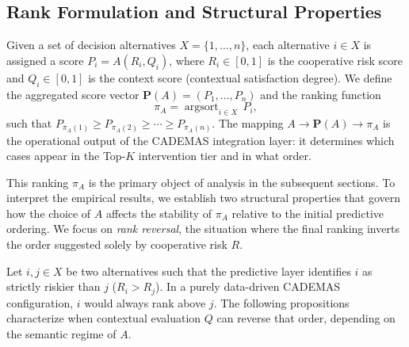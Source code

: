 \documentclass[mathematics,article,submit,moreauthors]{Definitions/mdpi}
\begin{document}
\subsection{Rank Formulation and Structural Properties}
\label{subsect:rank_properties}

Given a set of decision alternatives $X = \{1,\dots,n\}$, each alternative $i \in X$ is assigned a score $P_i = A(R_i, Q_i)$, where $R_i \in [0,1]$ is the cooperative risk score and $Q_i \in [0,1]$ is the context score (contextual satisfaction degree). We define the aggregated score vector $\mathbf{P}(A) = (P_1, \dots, P_n)$ and the ranking function
\begin{equation}
\pi_A = \operatorname{argsort}_{i \in X} \, P_i,
\end{equation}
such that $P_{\pi_A(1)} \geq P_{\pi_A(2)} \geq \cdots \geq P_{\pi_A(n)}$. The mapping $A \rightarrow \mathbf{P}(A) \rightarrow \pi_A$ is the operational output of the CADEMAS integration layer: it determines which cases appear in the Top-$K$ intervention tier and in what order.

This ranking $\pi_A$ is the primary object of analysis in the subsequent sections. To interpret the empirical results, we establish two structural properties that govern how the choice of $A$ affects the stability of $\pi_A$ relative to the initial predictive ordering. We focus on \emph{rank reversal}, the situation where the final ranking inverts the order suggested solely by cooperative risk $R$.

Let $i, j \in X$ be two alternatives such that the predictive layer identifies $i$ as strictly riskier than $j$ ($R_i > R_j$). In a purely data-driven CADEMAS configuration, $i$ would always rank above $j$. The following propositions characterize when contextual evaluation $Q$ can reverse that order, depending on the semantic regime of $A$.
\end{document}
